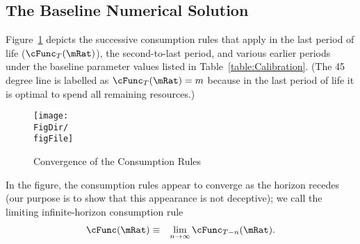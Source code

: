 \documentclass[titlepage]{\econtex}\providecommand{\texname}{BufferStockTheory}%
\providecommand{\FigDir}{Figures}
\providecommand{\TableDir}{Tables}
\begin{document}
\begin{comment}
In the case where the permanent shocks are lognormally distributed, we have
\begin{eqnarray}
\Ex[\pshk^{1-\CRRA}] & = &\exp((1-\CRRA)(-\sigma^{2}_{\pshk}/2)+(1-\CRRA)^{2}\sigma_{\pshk}^{2})
\\ & = & \exp((1-\CRRA)((-1/2)+(1-\CRRA))\sigma_{\pshk}^{2})
\\ & = & \exp((1-\CRRA)(1/2-\CRRA)\sigma_{\pshk}^{2})
%
\end{eqnarray}
\end{comment}

\begin{comment}
Equation
  \eqref{eq:GIC} can be raised to the $\CRRA$ power yielding the
  alternative form $(\Rfree \DiscFac) \PGroAdj^{-\CRRA} < 1$ which
  Deaton~\citeyearpar{deatonLiqConstr} imposed to guarantee that his
  problem defined a contraction mapping.
\end{comment}


\hypertarget{Baseline-Numerical-Solution}{}
\subsection{The Baseline Numerical Solution}

Figure~\ref{fig:cFuncsConverge} depicts the successive consumption
rules that apply in the last period of life ($\cFunc_{T}(\mRat)$), the
second-to-last period, and various earlier periods under the
baseline parameter values listed in Table~\ref{table:Calibration}.
(The 45 degree line is labelled as $\cFunc_{T}(\mRat) = m$ because in
the last period of life it is optimal to spend all remaining
resources.)



\providecommand{\figName}{Convergence-of-the-Consumption-Rules}
\providecommand{\figFile}{cFuncsConverge}
\hypertarget{\figFile}{}
\hypertarget{\figName}{}
\begin{figure}[tbp]
\texttt{[image: \\FigDir/\\figFile]}
\caption{Convergence of the Consumption Rules}
\label{fig:\figFile}
\end{figure}

In the figure, the consumption rules appear to converge as the horizon
recedes (our purpose is to show that this appearance is not deceptive); we
call the limiting infinite-horizon consumption rule
\begin{eqnarray}
\cFunc(\mRat) & \equiv & \lim_{n \rightarrow \infty} \cFunc_{T-n}(\mRat).
\end{eqnarray}
\end{document}
